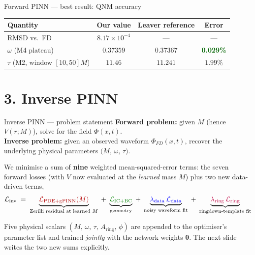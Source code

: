 \documentclass[aspectratio=169, 11pt]{beamer}
\newcommand{\qnm}{QNM}
\newcommand{\fd}{FD}
\begin{document}
\begin{frame}{Forward PINN --- best result: \qnm{} accuracy}
  \centering
  \renewcommand{\arraystretch}{1.25}
  \begin{tabular}{@{}lccc@{}}
    \toprule
    \textbf{Quantity} & \textbf{Our value} & \textbf{Leaver reference} & \textbf{Error} \\
    \midrule
    RMSD vs.\ \fd{}                  & $8.17\!\times\!10^{-4}$ & ---     & --- \\
    $\omega$  (M4 plateau)           & $0.37359$               & $0.37367$ & \textcolor{darkgreen}{\textbf{0.029\%}} \\
    $\tau$    (M2, window $[10,50]M$) & $11.46$                 & $11.241$  & $1.99\%$ \\
    \bottomrule
  \end{tabular}
  \vspace{6mm}

\end{frame}


\section{3. Inverse PINN}

\begin{frame}{Inverse PINN --- problem statement}
  \textbf{Forward problem:} given $M$ (hence $V(r;M)$), solve for the field
  $\Phi(x,t)$.\\
  \textbf{Inverse problem:} given an observed waveform $\Phi_{\!\fd{}}(x,t)$,
  recover the underlying physical parameters
  $\bigl(M,\,\omega,\,\tau\bigr)$.
  \bigskip

  We minimise a sum of \textbf{nine} weighted mean-squared-error terms:
  the seven forward losses (with $V$ now evaluated at the \emph{learned}
  mass $M$) plus two new data-driven terms,
  \[
    \mathcal{L}_{\text{inv}}
    \;=\;
    \underbrace{\textcolor{darkred}{\mathcal{L}_{\text{PDE}+\text{gPINN}}(M)}}_{\text{Zerilli residual at learned }M}
    \;+\;
    \underbrace{\textcolor{darkgreen}{\mathcal{L}_{\text{IC}+\text{BC}}}}_{\text{geometry}}
    \;+\;
    \underbrace{\textcolor{blue}{\lambda_{\text{data}}\,\mathcal{L}_{\text{data}}}}_{\text{noisy waveform fit}}
    \;+\;
    \underbrace{\textcolor{purple}{\lambda_{\text{ring}}\,\mathcal{L}_{\text{ring}}}}_{\text{ringdown-template fit}}
  \]
  \bigskip

  Five physical scalars
  $(M,\,\omega,\,\tau,\,A_{\mathrm{ring}},\,\phi)$
  are appended to the optimiser's parameter list and trained
  \emph{jointly} with the network weights $\boldsymbol{\theta}$.
  The next slide writes the two new sums explicitly.
\end{frame}
\end{document}
